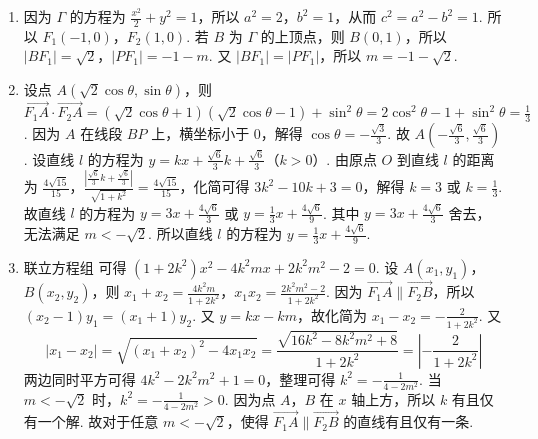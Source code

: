\begin{solution}
\begin{enumerate}
\item 因为 \(\Gamma\) 的方程为 \(\frac{x^2}{2}+y^2=1\)，所以 \(a^2=2\)，\(b^2=1\)，从而 \(c^2=a^2-b^2=1\). 所以 \(F_1(-1,0)\)，\(F_2(1,0)\). 若 \(B\) 为 \(\Gamma\) 的上顶点，则 \(B(0,1)\)，所以 \(\left| BF_1 \right|=\sqrt2\)，\(\left| PF_1 \right|=-1-m\). 又 \(\left| BF_1 \right|=\left| PF_1 \right|\)，所以 \(m=-1-\sqrt2\).

\item 设点 \(A\left( \sqrt2\cos\theta,\sin\theta \right)\)，则 \(\overrightarrow{F_1A}\cdot \overrightarrow{F_2A}=\left( \sqrt2\cos\theta+1 \right)\left( \sqrt2\cos\theta-1 \right)+\sin^2\theta=2\cos^2\theta-1+\sin^2\theta=\frac13\). 因为 \(A\) 在线段 \(BP\) 上，横坐标小于 \(0\)，解得 \(\cos\theta=-\frac{\sqrt3}{3}\). 故 \(A\left( -\frac{\sqrt6}{3},\frac{\sqrt6}{3} \right)\). 设直线 \(l\) 的方程为 \(y=kx+\frac{\sqrt6}{3}k+\frac{\sqrt6}{3}\)（\(k>0\)）. 由原点 \(O\) 到直线 \(l\) 的距离为 \(\frac{4\sqrt{15}}{15}\)，\(\frac{\left| \frac{\sqrt6}{3}k+\frac{\sqrt6}{3} \right|}{\sqrt{1+k^2}}=\frac{4\sqrt{15}}{15}\)，化简可得 \(3k^2-10k+3=0\)，解得 \(k=3\) 或 \(k=\frac13\). 故直线 \(l\) 的方程为 \(y=3x+\frac{4\sqrt6}{3}\) 或 \(y=\frac13x+\frac{4\sqrt6}{9}\). 其中 \(y=3x+\frac{4\sqrt6}{3}\) 舍去，无法满足 \(m<-\sqrt2\). 所以直线 \(l\) 的方程为 \(y=\frac13x+\frac{4\sqrt6}{9}\).

\item 联立方程组
可得 \(\left( 1+2k^2 \right)x^2-4k^2mx+2k^2m^2-2=0\). 设 \(A(x_1,y_1)\)，\(B(x_2,y_2)\)，则 \(x_1+x_2=\frac{4k^2m}{1+2k^2}\)，\(x_1x_2=\frac{2k^2m^2-2}{1+2k^2}\). 因为 \(\overrightarrow{F_1A}\parallel \overrightarrow{F_2B}\)，所以 \(\left( x_2-1 \right)y_1=\left( x_1+1 \right)y_2\). 又 \(y=kx-km\)，故化简为 \(x_1-x_2=-\frac{2}{1+2k^2}\). 又
\[
\left| x_1-x_2 \right|
=\sqrt{\left( x_1+x_2 \right)^2-4x_1x_2}
=\frac{\sqrt{16k^2-8k^2m^2+8}}{1+2k^2}
=\left| -\frac{2}{1+2k^2} \right|
\]
两边同时平方可得 \(4k^2-2k^2m^2+1=0\)，整理可得 \(k^2=-\frac{1}{4-2m^2}\). 当 \(m<-\sqrt2\) 时，\(k^2=-\frac{1}{4-2m^2}>0\). 因为点 \(A\)，\(B\) 在 \(x\) 轴上方，所以 \(k\) 有且仅有一个解. 故对于任意 \(m<-\sqrt2\)，使得 \(\overrightarrow{F_1A}\parallel \overrightarrow{F_2B}\) 的直线有且仅有一条.
\end{enumerate}
\end{solution}

